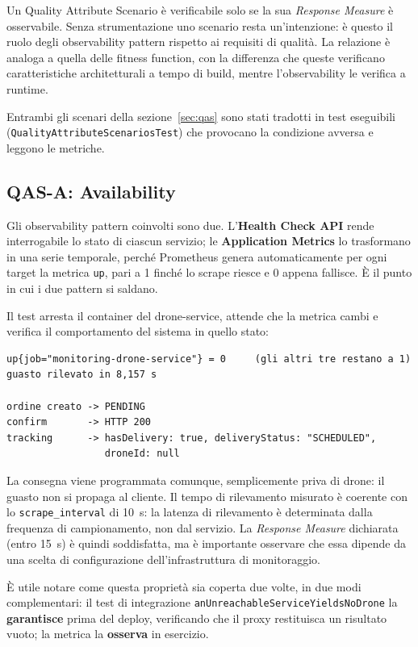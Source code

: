 \documentclass[12pt,a4paper]{article}
\begin{document}
Un Quality Attribute Scenario \`e verificabile solo se la sua \emph{Response Measure} \`e osservabile.
Senza strumentazione uno scenario resta un'intenzione: \`e questo il ruolo degli observability
pattern rispetto ai requisiti di qualit\`a. La relazione \`e analoga a quella delle fitness function,
con la differenza che queste verificano caratteristiche architetturali a tempo di build, mentre
l'observability le verifica a runtime.

Entrambi gli scenari della sezione~\ref{sec:qas} sono stati tradotti in test eseguibili
(\texttt{QualityAttributeScenariosTest}) che provocano la condizione avversa e leggono le metriche.

\subsection{QAS-A: Availability}

Gli observability pattern coinvolti sono due. L'\textbf{Health Check API} rende interrogabile lo stato
di ciascun servizio; le \textbf{Application Metrics} lo trasformano in una serie temporale, perch\'e
Prometheus genera automaticamente per ogni target la metrica \texttt{up}, pari a 1 finch\'e lo scrape
riesce e 0 appena fallisce. \`E il punto in cui i due pattern si saldano.

Il test arresta il container del drone-service, attende che la metrica cambi e verifica il
comportamento del sistema in quello stato:

\begin{lstlisting}[caption={Esito osservato}]
up{job="monitoring-drone-service"} = 0     (gli altri tre restano a 1)
guasto rilevato in 8,157 s

ordine creato -> PENDING
confirm       -> HTTP 200
tracking      -> hasDelivery: true, deliveryStatus: "SCHEDULED",
                 droneId: null
\end{lstlisting}

La consegna viene programmata comunque, semplicemente priva di drone: il guasto non si propaga al
cliente. Il tempo di rilevamento misurato \`e coerente con lo \texttt{scrape\_interval} di 10~s: la
latenza di rilevamento \`e determinata dalla frequenza di campionamento, non dal servizio. La
\emph{Response Measure} dichiarata (entro 15~s) \`e quindi soddisfatta, ma \`e importante osservare
che essa dipende da una scelta di configurazione dell'infrastruttura di monitoraggio.

\`E utile notare come questa propriet\`a sia coperta due volte, in due modi complementari: il test di
integrazione \texttt{anUnreachableServiceYieldsNoDrone} la \textbf{garantisce} prima del deploy,
verificando che il proxy restituisca un risultato vuoto; la metrica la \textbf{osserva} in esercizio.
\end{document}
